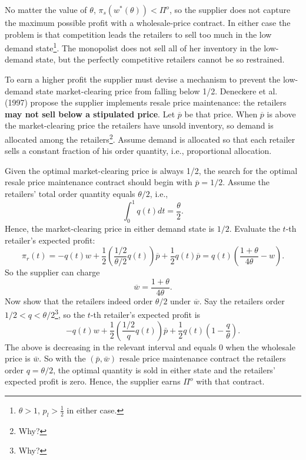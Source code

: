 No matter the value of $\theta$, $\pi_s(w^*(\theta))<\Pi^o$, so the supplier does not capture the maximum possible profit with a wholesale-price contract. In either case the problem is that competition leads the retailers to sell too much in the low demand state\footnote{$\theta> 1$, $p_l>\frac{1}{2}$ in either case.}. The monopolist does not sell all of her inventory in the low-demand state, but the perfectly competitive retailers cannot be so restrained.
\newcommand{\op}{\overline{p}}

To earn a higher profit the supplier must devise a mechanism to prevent
the low-demand state market-clearing price from falling below 1/2. Deneckere et al. (1997) propose the supplier implements resale price maintenance: the retailers \textbf{may not sell below a stipulated price}. Let $\op$ be that price. When $\op$ is above the market-clearing price the retailers have unsold inventory, so demand is allocated among the retailers\footnote{Why?}. Assume demand is allocated so that each retailer sells a constant fraction of his order quantity, i.e., proportional allocation.

Given the optimal market-clearing price is always 1/2, the search for the
optimal resale price maintenance contract should begin with $\op=1/2$. Assume the retailers' total order quantity equals $\theta/2$, i.e.,
\begin{equation}\label{eq:5.4}
    \int_0^1 q(t)dt=\frac{\theta}{2}.
\end{equation}
Hence, the market-clearing price in either demand state is $1/2$. Evaluate the $t$-th retailer's expected profit:
\begin{equation*}
    \pi_r(t)=-q(t)w+\frac{1}{2}\left(\frac{1/2}{\theta/2}q(t)\right)\op+\frac{1}{2}q(t)\op=q(t)\left(\frac{1+\theta}{4\theta}-w\right).
\end{equation*}
So the supplier can charge 
$$\overline{w}=\frac{1+\theta}{4\theta}.$$
Now show that the retailers indeed order $\theta/2$ under $\overline{w}$. 
Say the retailers order $1 / 2<q<\theta / 2$\footnote{Why?}, so the $t$-th retailer's expected profit is
$$
-q(t) w+\frac{1}{2}\left(\frac{1 / 2}{q} q(t)\right) \bar{p}+\frac{1}{2} q(t)\left(1-\frac{q}{\theta}\right) .
$$
The above is decreasing in the relevant interval and equals 0 when the wholesale price is $\bar{w}$. So with the $(\bar{p}, \bar{w})$ resale price maintenance contract the retailers order $q=\theta / 2$, the optimal quantity is sold in either state and the retailers' expected profit is zero. Hence, the supplier earns $\Pi^{o}$ with that contract.

